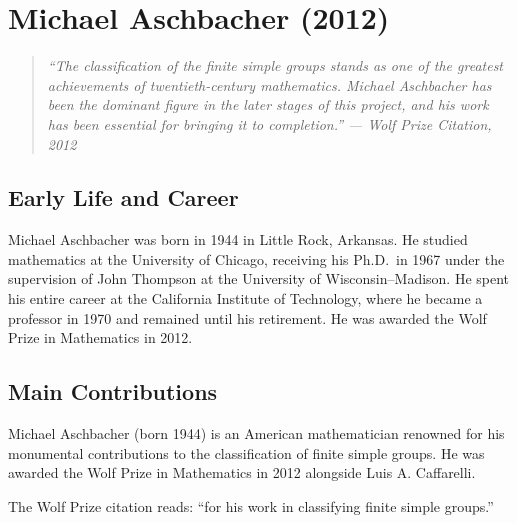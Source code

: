 \providecommand{\Inn}{\operatorname{Inn}}
\providecommand{\PSU}{\operatorname{PSU}}
\providecommand{\Sz}{\operatorname{Sz}}
\providecommand{\Ree}{\operatorname{Ree}}
\providecommand{\Suz}{\operatorname{Suz}}
\providecommand{\G}{\operatorname{G}}

\chapter{Michael Aschbacher (2012)}

\begin{quote}
\it ``The classification of the finite simple groups stands as one of the greatest achievements of twentieth-century mathematics. Michael Aschbacher has been the dominant figure in the later stages of this project, and his work has been essential for bringing it to completion.'' --- Wolf Prize Citation, 2012
\end{quote}

\section{Early Life and Career}

Michael Aschbacher was born in 1944 in Little Rock, Arkansas. He studied mathematics at the University of Chicago, receiving his Ph.D.\ in 1967 under the supervision of John Thompson at the University of Wisconsin--Madison. He spent his entire career at the California Institute of Technology, where he became a professor in 1970 and remained until his retirement. He was awarded the Wolf Prize in Mathematics in 2012.

\section{Main Contributions}

Michael Aschbacher (born 1944) is an American mathematician renowned for his monumental contributions to the classification of finite simple groups. He was awarded the Wolf Prize in Mathematics in 2012 alongside Luis A. Caffarelli.

The Wolf Prize citation reads: ``for his work in classifying finite simple groups.''

